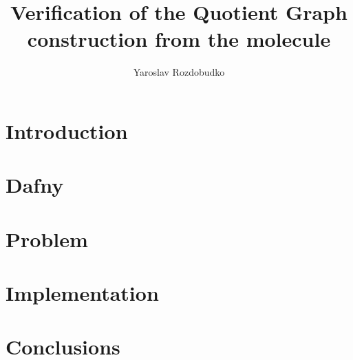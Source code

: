 \documentclass{article}
\title{Verification of the Quotient Graph construction from the molecule}
\author{
  Yaroslav Rozdobudko
}
\begin{document}
\maketitle

\tableofcontents
\newpage

\section{Introduction}


\section{Dafny}


\section{Problem}
\label{sec:description}


\section{Implementation}


\section{Conclusions}




\end{document}
